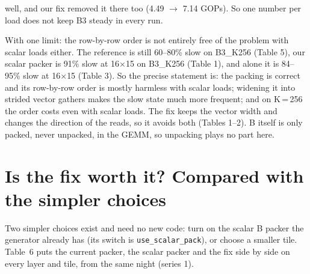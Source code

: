 \documentclass[10pt,a4paper]{article}
\begin{document}
\begin{enumerate}
\begin{itemize}
    well, and our fix removed it there too (4.49 $\to$ 7.14 GOPs). So one number per load does not keep B3 steady in every run.
  \end{itemize}
  With one limit: the row-by-row order is not entirely free of the problem with scalar loads either. The reference is still 60--80\%
  slow on B3\_K256 (Table 5), our scalar packer is 91\% slow at 16$\times$15 on B3\_K256 (Table 1), and alone it is 84--95\% slow at
  16$\times$15 (Table 3). So the precise statement is: the packing is correct and its row-by-row order is mostly harmless with scalar
  loads; widening it into strided vector gathers makes the slow state much more frequent; and on K\,=\,256 the order costs even with
  scalar loads. The fix keeps the vector width and changes the direction of the reads, so it avoids both (Tables 1--2). B itself is
  only packed, never unpacked, in the GEMM, so unpacking plays no part here.
\end{enumerate}

\section{Is the fix worth it? Compared with the simpler choices}
\label{sec:worth}
Two simpler choices exist and need no new code: turn on the scalar B packer the generator already has (its switch is
\texttt{use\_scalar\_pack}), or choose a smaller tile. Table~6 puts the current packer, the scalar packer and the fix side by side on every layer and tile, from the same
night (series 1).
\end{document}
